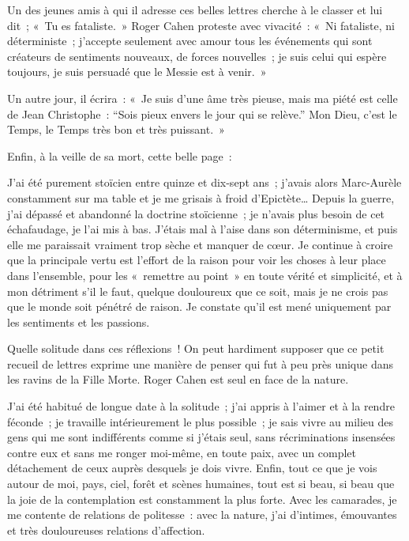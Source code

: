 \documentclass[french,twoside]{book} %
\newenvironment{quoteblock}%
  {\begin{quoting}}
  {\end{quoting}}
\newenvironment{quotebar}{%
    \def\FrameCommand{{\color{rubric!10!}\vrule width 0.5em} \hspace{0.9em}}%
    \def\OuterFrameSep{\itemsep} %
    \MakeFramed {\advance\hsize-\width \FrameRestore}
  }%
  {%
    \endMakeFramed
  }
\renewenvironment{quoteblock}%
  {%
    \savenotes
    \setstretch{0.9}
    \normalfont
    \begin{quotebar}
  }
  {%
    \end{quotebar}
    \spewnotes
  }
\begin{document}
\noindent Un des jeunes amis à qui il adresse ces belles lettres cherche à le classer et lui dit ; « Tu es fataliste. » Roger Cahen proteste avec vivacité : « Ni fataliste, ni déterministe ; j’accepte seulement avec amour tous les événements qui sont créateurs de sentiments nouveaux, de forces nouvelles ; je suis celui qui espère toujours, je suis persuadé que le Messie est à venir. »‌\par
Un autre jour, il écrira : « Je suis d’une âme très pieuse, mais ma piété est celle de Jean Christophe : “Sois pieux envers le jour qui se relève.” Mon Dieu, c’est le Temps, le Temps très bon et très puissant. »\par
Enfin, à la veille de sa mort, cette belle page :‌\par

\begin{quoteblock}
 \noindent J’ai été purement stoïcien entre quinze et dix-sept ans ; j’avais alors Marc-Aurèle constamment sur ma table et je me grisais à froid d’Epictète… Depuis la guerre, j’ai dépassé et abandonné la doctrine stoïcienne ; je n’avais plus besoin de cet échafaudage, je l’ai mis à bas. J’étais mal à l’aise dans son déterminisme, et puis elle me paraissait vraiment trop sèche et manquer de cœur. Je continue à croire que la principale vertu est l’effort de la raison pour voir les choses à leur place dans l’ensemble, pour les « remettre au point » en toute vérité et simplicité, et à mon détriment s’il le faut, quelque douloureux que ce soit, mais je ne crois pas que le monde soit pénétré de raison. Je constate qu’il est mené uniquement par les sentiments et les passions.‌
 \end{quoteblock}

\noindent Quelle solitude dans ces réflexions ! On peut hardiment supposer que ce petit recueil de lettres exprime une manière de penser qui fut à peu près unique dans les ravins de la Fille Morte. Roger Cahen est seul en face de la nature.‌\par

\begin{quoteblock}
 \noindent J’ai été habitué de longue date à la solitude ; j’ai appris à l’aimer et à la rendre féconde ; je travaille intérieurement le plus possible ; je sais vivre au milieu des gens qui me sont indifférents comme si j’étais seul, sans récriminations insensées contre eux et sans me ronger moi-même, en toute paix, avec un complet détachement de ceux auprès desquels je dois vivre. Enfin, tout ce que je vois autour de moi, pays, ciel, forêt et scènes humaines, tout est si beau, si beau que la joie de la contemplation est constamment la plus forte. Avec les camarades, je me contente de relations de politesse : avec la nature, j’ai d’intimes, émouvantes et très douloureuses relations d’affection.‌
 \end{quoteblock}
\end{document}
